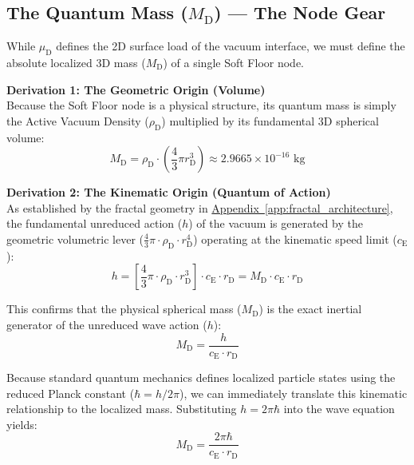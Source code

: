 \subsection{The Quantum Mass ($M_{\mathrm{D}}$) --- The Node Gear}
While $\mu_{\mathrm{D}}$ defines the 2D surface load of the vacuum interface, we must define the absolute localized 3D mass ($M_{\mathrm{D}}$) of a single Soft Floor node.

\vspace{0.4cm}
\noindent \textbf{Derivation 1: The Geometric Origin (Volume)}\\
Because the Soft Floor node is a physical structure, its quantum mass is simply the Active Vacuum Density ($\rho_{\mathrm{D}}$) multiplied by its fundamental 3D spherical volume:
\begin{equation}
    M_{\mathrm{D}} = \rho_{\mathrm{D}} \cdot \left(\frac{4}{3}\pi r_{\mathrm{D}}^3\right) \approx 2.9665 \times 10^{-16} \text{ kg}
\end{equation}

\vspace{0.4cm}
\noindent \textbf{Derivation 2: The Kinematic Origin (Quantum of Action)}\\
As established by the fractal geometry in \hyperref[app:fractal_architecture]{Appendix~\ref*{app:fractal_architecture}}, the fundamental unreduced action ($h$) of the vacuum is generated by the geometric volumetric lever ($\frac{4}{3}\pi \cdot \rho_{\mathrm{D}} \cdot r_{\mathrm{D}}^4$) operating at the kinematic speed limit ($c_{\mathrm{E}}$):
\begin{equation}
    h = \left[ \frac{4}{3}\pi \cdot \rho_{\mathrm{D}} \cdot r_{\mathrm{D}}^3 \right] \cdot c_{\mathrm{E}} \cdot r_{\mathrm{D}} = M_{\mathrm{D}} \cdot c_{\mathrm{E}} \cdot r_{\mathrm{D}}
\end{equation}

This confirms that the physical spherical mass ($M_{\mathrm{D}}$) is the exact inertial generator of the unreduced wave action ($h$):
\begin{equation}
    M_{\mathrm{D}} = \frac{h}{c_{\mathrm{E}} \cdot r_{\mathrm{D}}}
\end{equation}

Because standard quantum mechanics defines localized particle states using the reduced Planck constant ($\hbar = h / 2\pi$), we can immediately translate this kinematic relationship to the localized mass. Substituting $h = 2\pi\hbar$ into the wave equation yields:
\begin{equation}
    M_{\mathrm{D}} = \frac{2\pi \hbar}{c_{\mathrm{E}} \cdot r_{\mathrm{D}}}
\end{equation}

